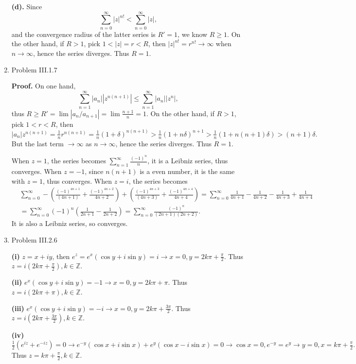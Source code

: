 \documentclass{article}%
\begin{document}
\begin{enumerate}
\textbf{(d).} Since 
$$
\sum_{n=0}^{\infty}|z|^{n!} < \sum_{n=0}^{\infty}|z|,
$$
and the convergence radius of the latter series is $R' = 1$, we know $R\ge 1$. On the other hand, if $R > 1$, pick $1 < |z| = r < R$, then $|z|^{n!} = r^{n!}\to\infty $ when $n\to\infty$, hence the series diverges. Thus $R = 1$.

\item Problem III.1.7

\textbf{Proof.} On one hand, 
$$
\sum_{n=1}^{\infty} |a_n| |z^{n(n+1)}| \le \sum_{n=1}^{\infty}|a_n||z^n|,
$$
thus $R \ge R' = \lim|a_n/a_{n+1}| = \lim \frac{n+1}{n} = 1 $. On the other hand, if $R > 1$, pick $1 < r < R$, then $|a_n|z^{n(n+1)} = \frac{1}{n}r^{n(n+1)} = \frac{1}{n}(1+\delta)^{n(n+1)} > \frac{1}{n} (1+n\delta)^{n+1} > \frac{1}{n}(1+n(n+1)\delta) > (n+1)\delta. $ But the last term $\to\infty$ as $n\to\infty$, hence the series diverges. Thus $R = 1$.

When $z = 1$, the series becomes $\sum_{n=1}^{\infty}\frac{(-1)^n}{n}$, it is a Leibniz series, thus converges. When $z = -1$, since $n(n+1)$ is a even number, it is the same with $z = 1$, thus converges. When $z = i$, the series becomes
$$
\begin{aligned}
&\sum_{n=0}^{\infty} -\left(\frac{(-1)^{4n+1}}{(4n+1)}+\frac{(-1)^{4n+2}}{4n+2}\right)+\left(\frac{(-1)^{4n+3}}{(4n+3)}+\frac{(-1)^{4n+4}}{4n+4}\right) = \sum_{n=0}^{\infty}\frac{1}{4n+1}-\frac{1}{4n+2}-\frac{1}{4n+3}+\frac{1}{4n+4} \\
&= \sum_{n=0}^{\infty}(-1)^n (\frac{1}{2n+1}-\frac{1}{2n+2}) = \sum_{n=0}^{\infty}\frac{(-1)^n}{(2n+1)(2n+2)}.
\end{aligned}
$$
It is also a Leibniz series, so converges.


\item Problem III.2.6

\textbf{(i)} $z = x+iy$, then $e^z = e^x(\cos y+i\sin y) = i \to x = 0, y = 2k\pi + \frac{\pi}{2}$. Thus $z = i(2k\pi+\frac{\pi}{2}), k \in \mathbb{Z}$.

\textbf{(ii)} $e^x(\cos y+i\sin y) = -1 \to x = 0, y = 2k\pi+\pi $. Thus $z = i(2k\pi+\pi), k \in \mathbb{Z}$.

\textbf{(iii)} $e^x(\cos y+i\sin y) = -i \to x = 0, y = 2k\pi + \frac{3\pi}{2}$. Thus $z = i(2k\pi+\frac{3\pi}{2}), k \in \mathbb{Z}$.

\textbf{(iv)} $\frac{1}{2}(e^{iz}+e^{-iz}) = 0 \to e^{-y}(\cos x+i\sin x)+e^y(\cos x-i\sin x) = 0 \to \cos x = 0, e^{-y} = e^y \to y = 0, x = k\pi+\frac{\pi}{2}. $ Thus $z = k\pi+\frac{\pi}{2}, k\in\mathbb{Z} $.


\end{enumerate}
\end{document}
